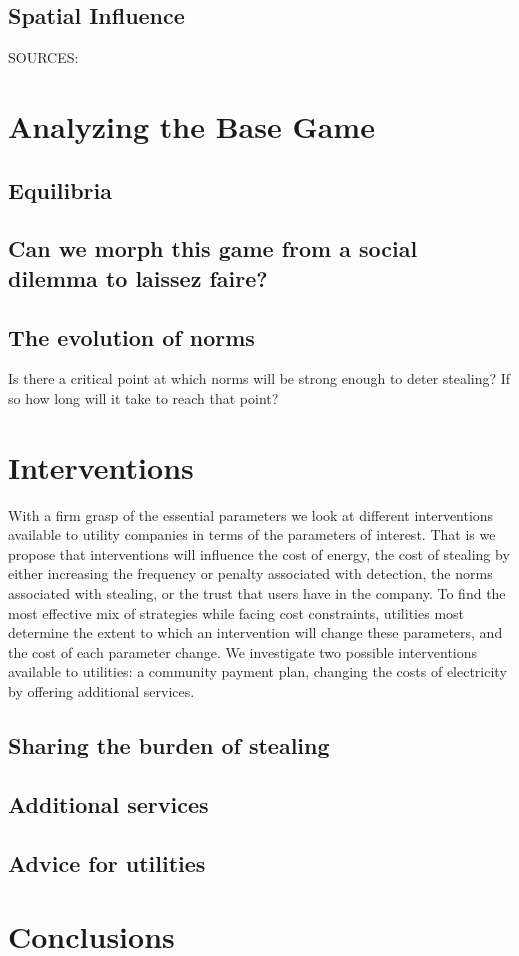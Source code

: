 \documentclass{article}
\begin{document}
\subsection{Spatial Influence}  
SOURCES:
\section{Analyzing the Base Game}

\subsection{Equilibria}

\subsection{Can we morph this game from a social dilemma to laissez faire?}

\subsection{The evolution of norms}
Is there a critical point at which norms will be strong enough to deter stealing? If so how long will it take to reach that point? 

\section{Interventions}
With a firm grasp of the essential parameters we look at different interventions available to utility companies in terms of the parameters of interest. That is we propose that interventions will influence the cost of energy, the cost of stealing by either increasing the frequency or penalty associated with detection, the norms associated with stealing, or the trust that users have in the company. To find the most effective mix of strategies while facing cost constraints, utilities most determine the extent to which an intervention will change these parameters, and the cost of each parameter change. We investigate two possible interventions available to utilities: a community payment plan, changing the costs of electricity by offering additional services. 

\subsection{Sharing the burden of stealing}

\subsection{Additional services}

\subsection{Advice for utilities}

\section{Conclusions}
\end{document}
